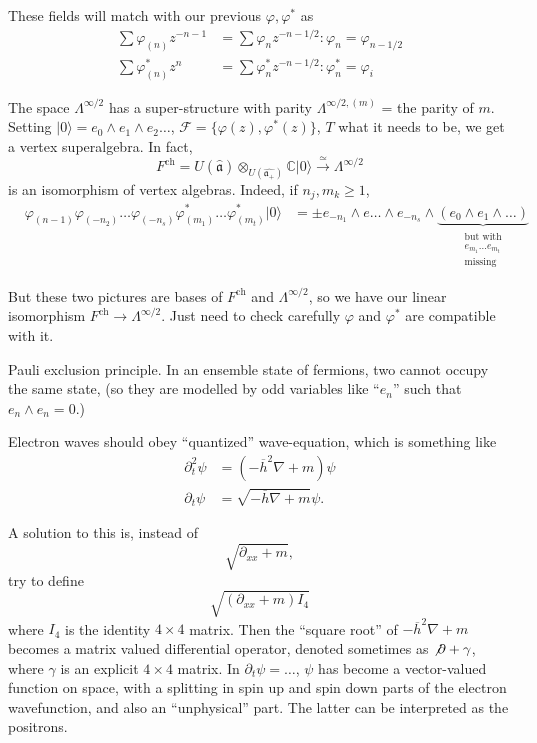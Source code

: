 \begin{exercise}
\label{exercise-relations-for-these-fields}
These fields will match with our previous
$\varphi,\varphi^*$ as
$$
\begin{aligned}
\sum \varphi_{(n)}z^{-n-1}&=\sum \varphi_n
z^{-n-1/2}
: \varphi_n=\varphi_{n-1/2}\\
\sum \varphi_{(n)}^*z^n&=\sum \varphi_n^*
z^{-n-1/2}
: \varphi_n^*=\varphi_i
\end{aligned}
$$
\end{exercise}

\medskip\noindent
The space $\Lambda^{\infty/2}$ has a
super-structure
with parity $\Lambda^{\infty/2,(m)}$ = the
parity of $m$.
Setting
$|0\rangle=e_0 \wedge e_1 \wedge e_2 \ldots$,
$\mathcal{F}=\{\varphi(z),\varphi^*(z)\}$,
$T$ what it needs to be,
we get a vertex superalgebra.
In fact,
$$
F^{\text{ch}}=U(\hat{\mathfrak{a}})
\otimes_{U(\hat{\mathfrak{a}_+})}
\mathbb{C}|0\rangle
\xrightarrow{\simeq}\Lambda^{\infty/2}
$$
is an isomorphism of vertex algebras.
Indeed, if $n_j,m_k \geq 1$,
$$
\begin{aligned}
&\varphi_{(n-1)}\varphi_{(-n_2)}
\ldots\varphi_{(-n_s)}
\varphi^*_{(m_1)}\ldots
\varphi^*_{(m_t)}|0\rangle
&=\pm e_{-n_1}\wedge e\ldots \wedge e_{-n_s}
\wedge \underbrace{(e_0 \wedge e_1 \wedge
\ldots)
}_{\substack{\text{but with} \\ e_{m_1}\ldots
e_{m_t}\\
\text{missing}}}
\end{aligned}
$$

\noindent
But these two pictures are bases of
$F^{\text{ch}}$ and $\Lambda^{\infty/2}$,
so we have our linear isomorphism
$F^{\text{ch}} \to \Lambda^{\infty/2}$.
Just need to check carefully $\varphi$ and
$\varphi^*$
are compatible with it.

\medskip\noindent
Pauli exclusion principle. In an ensemble
state of fermions,
two cannot occupy the same state,
(so they are modelled by odd variables
like ``$e_n$'' such that $e_n \wedge e_n=0$.)

Electron waves should obey
``quantized'' wave-equation,
which is something like
$$
\begin{aligned}
\partial_t^2 \psi&=(- \overline{h}^2
\nabla+m)\psi\\
\partial_t
\psi&=\sqrt{-\overline{h}\nabla+m}\psi.
\end{aligned}
$$

\noindent
A solution to this is, instead of
$$
\sqrt{\partial_{x x}+m},
$$
try to define
$$
\sqrt{(\partial_{x x}+m)I_4}
$$
where $I_4$ is the identity $4 \times 4 $
matrix.
Then the ``square root'' of $-\overline{h}^2
\nabla +m$
becomes a matrix valued differential
operator,
denoted sometimes as $\not \partial +
\gamma$,
where $\gamma$ is an explicit $4 \times 4$
matrix.
In $\partial_t \psi=\ldots$, $\psi$ has
become
a vector-valued function on space,
with a splitting in spin up and spin down
parts
of the electron wavefunction, and also an
``unphysical'' part. The latter
can be interpreted as the positrons.

